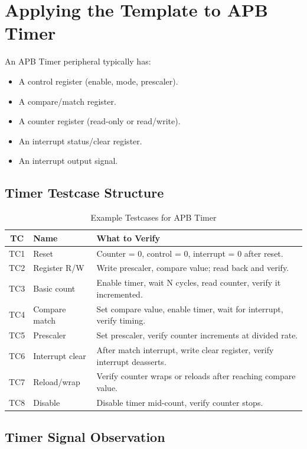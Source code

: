 \section{Applying the Template to APB Timer}

An APB Timer peripheral typically has:
\begin{itemize}[leftmargin=2em]
  \item A control register (enable, mode, prescaler).
  \item A compare/match register.
  \item A counter register (read-only or read/write).
  \item An interrupt status/clear register.
  \item An interrupt output signal.
\end{itemize}

\subsection{Timer Testcase Structure}

\begin{table}[H]
\centering
\caption{Example Testcases for APB Timer}
\label{tab:timer_tc}
\begin{tabularx}{\textwidth}{@{}clX@{}}
\toprule
\textbf{TC} & \textbf{Name} & \textbf{What to Verify} \\
\midrule
TC1 & Reset & Counter = 0, control = 0, interrupt = 0 after reset. \\
TC2 & Register R/W & Write prescaler, compare value; read back and verify. \\
TC3 & Basic count & Enable timer, wait N cycles, read counter, verify it incremented. \\
TC4 & Compare match & Set compare value, enable timer, wait for interrupt, verify timing. \\
TC5 & Prescaler & Set prescaler, verify counter increments at divided rate. \\
TC6 & Interrupt clear & After match interrupt, write clear register, verify interrupt deasserts. \\
TC7 & Reload/wrap & Verify counter wraps or reloads after reaching compare value. \\
TC8 & Disable & Disable timer mid-count, verify counter stops. \\
\bottomrule
\end{tabularx}
\end{table}

\subsection{Timer Signal Observation}

